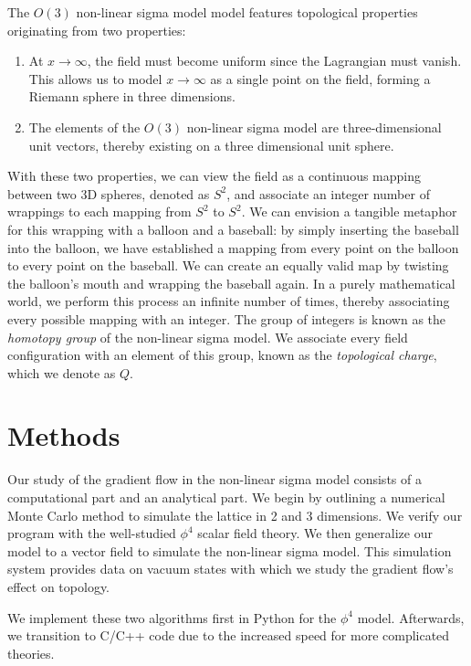 \documentclass[12pt]{report}
\begin{document}
The $O(3)$ non-linear sigma model model features topological properties originating from two properties: 
\begin{enumerate}
    \item At $x\rightarrow\infty$, the field must become uniform since the Lagrangian must vanish. This allows us to model $x\rightarrow\infty$ as a single point on the field, forming a Riemann sphere in three dimensions.
    \item The elements of the $O(3)$ non-linear sigma model are three-dimensional unit vectors, thereby existing on a three dimensional unit sphere. 
\end{enumerate}

With these two properties, we can view the field as a continuous mapping between two 3D spheres, denoted as $S^2$, and associate an integer number of wrappings to each mapping from $S^2$ to $S^2$. We can envision a tangible metaphor for this wrapping with a balloon and a baseball: by simply inserting the baseball into the balloon, we have established a mapping from every point on the balloon to every point on the baseball. We can create an equally valid map by twisting the balloon's mouth and wrapping the baseball again. In a purely mathematical world, we perform this process an infinite number of times, thereby associating every possible mapping with an integer. The group of integers is known as the \textit{homotopy group} of the non-linear sigma model. We associate every field configuration with an element of this group, known as the \textit{topological charge}, which we denote as $Q$.


\chapter{Methods}
\label{sec:methods}
Our study of the gradient flow in the non-linear sigma model consists of a computational part and an analytical part. We begin by outlining a numerical Monte Carlo method to simulate the lattice in 2 and 3 dimensions. We verify our program with the well-studied $\phi^4$ scalar field theory. We then generalize our model to a vector field to simulate the non-linear sigma model. This simulation system provides data on vacuum states with which we study the gradient flow's effect on topology.

We implement these two algorithms first in Python for the $\phi^4$ model. Afterwards, we transition to C/C++ code due to the increased speed for more complicated theories. 
\end{document}
